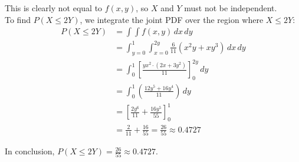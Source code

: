 This is clearly not equal to $f(x,y)$, so $X$ and $Y$ must not be independent.\\[1em]

To find $P(X \leq 2Y)$, we integrate the joint PDF over the region where $X \leq 2Y$:
\begin{align*}
	P(X \leq 2Y)
	 & = \int\int f(x,y) \, dx \, dy                                                       \\
	 & = \int_{y=0}^{1} \int_{x=0}^{2y} \frac{6}{11}\left(x^2y + xy^3\right) \, dx \, dy   \\
	 & = \int_{0}^{1} \left[ \frac{yx^2\cdot\left(2x+3y^2\right)}{11} \right]_0^{2y} \, dy \\
	 & = \int_{0}^{1} \left( \frac{12y^5+16y^4}{11} \right) \, dy                          \\
	 & = \left[ \frac{2y^6}{11} + \frac{16y^5}{55} \right]_0^1                             \\
	 & = \frac{2}{11} + \frac{16}{55} = \frac{26}{55} \approx 0.4727
\end{align*}

In conclusion, $P(X \leq 2Y) = \frac{26}{55} \approx 0.4727$.
